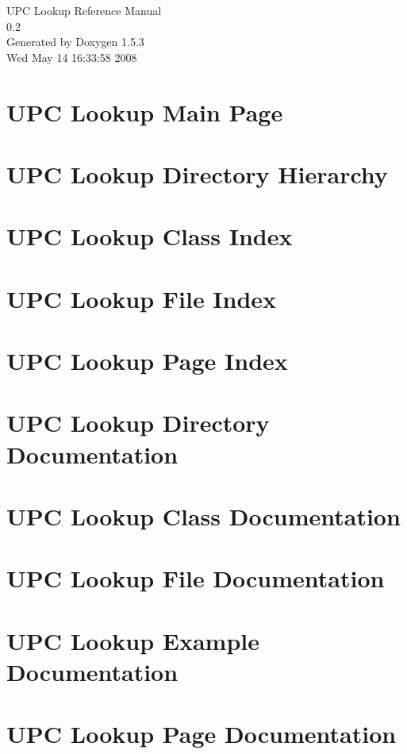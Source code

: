 \documentclass[letterpaper]{book}
\begin{document}
\begin{titlepage}
\vspace*{7cm}
\begin{center}
{\Large UPC Lookup Reference Manual\\[1ex]\large 0.2 }\\
\vspace*{1cm}
{\large Generated by Doxygen 1.5.3}\\
\vspace*{0.5cm}
{\small Wed May 14 16:33:58 2008}\\
\end{center}
\end{titlepage}
\clearemptydoublepage
{}
\tableofcontents
\clearemptydoublepage
{}
\chapter{UPC Lookup Main Page}
\label{index}\hypertarget{index}{}
\chapter{UPC Lookup Directory Hierarchy}

\chapter{UPC Lookup Class Index}

\chapter{UPC Lookup File Index}

\chapter{UPC Lookup Page Index}

\chapter{UPC Lookup Directory Documentation}

\chapter{UPC Lookup Class Documentation}

\chapter{UPC Lookup File Documentation}












\chapter{UPC Lookup Example Documentation}

\chapter{UPC Lookup Page Documentation}



\printindex
\end{document}
